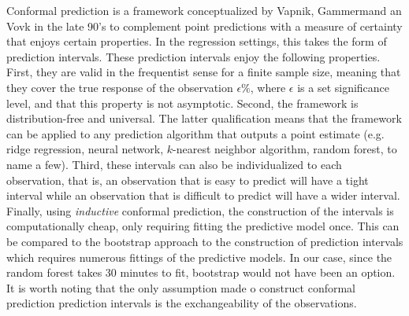 \documentclass[10pt]{jmlr}%
\begin{document}
Conformal prediction is a framework conceptualized by Vapnik, Gammermand an Vovk in the late 90's to complement point predictions with a measure of certainty that enjoys certain properties. In the regression settings, this takes the form of prediction intervals. These prediction intervals enjoy the following properties. First, they are valid in the frequentist sense for a finite sample size, meaning that they cover the true response of the observation $\epsilon \%$, where $\epsilon$ is a set significance level, and that this property is not asymptotic. Second, the framework is distribution-free and universal. The latter qualification means that the framework can be applied to any prediction algorithm that outputs a point estimate (e.g. ridge regression, neural network, $k$-nearest neighbor algorithm, random forest, to name a few). Third, these intervals can also be individualized to each observation, that is, an observation that is easy to predict will have a tight interval while an observation that is difficult to predict will have a wider interval. Finally, using \textit{inductive} conformal prediction, the construction of the intervals is computationally cheap, only requiring fitting the predictive model once. This can be compared to the bootstrap approach to the construction of prediction intervals which requires numerous fittings of the predictive models. In our case, since the random forest takes $30$ minutes to fit, bootstrap would not have been an option. It is worth noting that the only assumption made o construct conformal prediction prediction intervals is the exchangeability of the observations.
\end{document}
